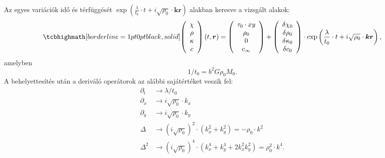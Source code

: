 \documentclass[10pt,a4paper]{scrartcl}
\let\mathbf\bm
\begin{document}
Az egyes variációk idő és térfüggését $\exp \left( {\frac{\lambda }{{{t_0}}} \cdot t + i\sqrt {{\rho _0}}  \cdot {\mathbf{kr}}} \right)$ alakban keresve a vizsgált alakok:
\begin{gather} \label{eq:perturbative_solution}
\tcbhighmath[borderline={1pt}{0pt}{black,solid}]{
\left( {\begin{array}{*{20}{c}}
  \chi  \\ 
  \rho  \\ 
  \kappa  \\ 
  c 
\end{array}} \right)\left( {t,{\mathbf{r}}} \right) = \left( {\begin{array}{*{20}{c}}
  {{\tau _0} \cdot xy} \\ 
  {{\rho _0}} \\ 
  0 \\ 
  {{c_\infty }} 
\end{array}} \right) + \left( {\begin{array}{*{20}{c}}
  {\delta {\chi _0}} \\ 
  {\delta {\rho _0}} \\ 
  {\delta {\kappa _0}} \\ 
  {\delta {c_0}} 
\end{array}} \right) \cdot \exp \left( {\frac{\lambda }{{{t_0}}} \cdot t + i\sqrt {{\rho _0}}  \cdot {\mathbf{kr}}} \right),}
\end{gather}
amelyben
\begin{equation} \label{eq:t_0_def}
1/{t_0} = {b^2}G{\rho _0}{M_0}.
\end{equation}
A behelyettesítés után a deriváló operátorok az alábbi sajátértéket veszik fel:
\begin{align} \label{eq:sajat_ertek_op}
  {\partial _t} &  \to \lambda /t_0 \\ 
  {\partial _x} &  \to i\sqrt {{\rho _0}}  \cdot {k_x} \\ 
  {\partial _y} &  \to i\sqrt {{\rho _0}}  \cdot {k_y} \\ 
  \Delta  &  \to {\left( {i\sqrt {{\rho _0}} } \right)^2} \cdot \left( {k_x^2 + k_y^2} \right) =  - {\rho _0} \cdot {k^2} \\ 
  {\Delta ^2} &  \to {\left( {i\sqrt {{\rho _0}} } \right)^4} \cdot \left( {k_x^4 + k_y^4 + 2k_x^2k_y^2} \right) = \rho _0^2 \cdot {k^4}. 
\end{align}
\end{document}
